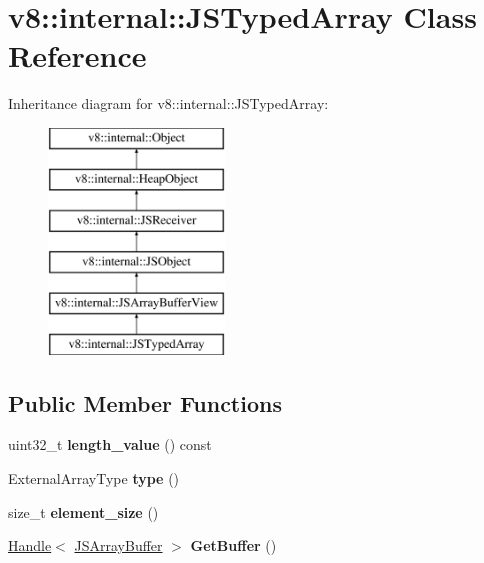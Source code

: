 \hypertarget{classv8_1_1internal_1_1_j_s_typed_array}{}\section{v8\+:\+:internal\+:\+:J\+S\+Typed\+Array Class Reference}
\label{classv8_1_1internal_1_1_j_s_typed_array}
Inheritance diagram for v8\+:\+:internal\+:\+:J\+S\+Typed\+Array\+:\begin{figure}[H]
\begin{center}
\leavevmode
\includegraphics[height=6.000000cm]{classv8_1_1internal_1_1_j_s_typed_array}
\end{center}
\end{figure}
\subsection*{Public Member Functions}
\begin{DoxyCompactItemize}
\item 
uint32\+\_\+t {\bfseries length\+\_\+value} () const \hypertarget{classv8_1_1internal_1_1_j_s_typed_array_a001a5d1299dd125c6d3dae3ee98aceef}{}\label{classv8_1_1internal_1_1_j_s_typed_array_a001a5d1299dd125c6d3dae3ee98aceef}

\item 
External\+Array\+Type {\bfseries type} ()\hypertarget{classv8_1_1internal_1_1_j_s_typed_array_afde5c223fea09a38b96115093437b3c8}{}\label{classv8_1_1internal_1_1_j_s_typed_array_afde5c223fea09a38b96115093437b3c8}

\item 
size\+\_\+t {\bfseries element\+\_\+size} ()\hypertarget{classv8_1_1internal_1_1_j_s_typed_array_aac811bca8603d48ef4ea6366abebcaa6}{}\label{classv8_1_1internal_1_1_j_s_typed_array_aac811bca8603d48ef4ea6366abebcaa6}

\item 
\hyperlink{classv8_1_1internal_1_1_handle}{Handle}$<$ \hyperlink{classv8_1_1internal_1_1_j_s_array_buffer}{J\+S\+Array\+Buffer} $>$ {\bfseries Get\+Buffer} ()\hypertarget{classv8_1_1internal_1_1_j_s_typed_array_a652f569a7f5248ef5990faa5682124d1}{}\label{classv8_1_1internal_1_1_j_s_typed_array_a652f569a7f5248ef5990faa5682124d1}

\end{DoxyCompactItemize}
